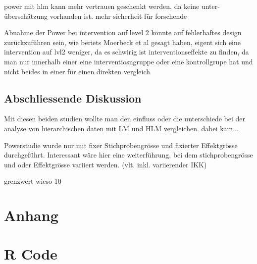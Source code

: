 \documentclass[12pt]{article}\usepackage[]{graphicx}\usepackage[]{color}
\begin{document}
power mit hlm kann mehr vertrauen geschenkt werden, da keine unter-überschätzung vorhanden ist. mehr sicherheit für forschende

Abnahme der Power bei intervention auf level 2 könnte auf fehlerhaftes design zurückzuführen sein, wie beriets Moerbeck et al gesagt haben, eigent sich eine intervention auf lvl2 weniger, da es schwirig ist interventionseffekte zu finden, da man nur innerhalb einer eine interventiosngruppe oder eine kontrollgrupe hat und nicht beides in einer für einen direkten vergleich

\subsection{Abschliessende Diskussion}
Mit diesen beiden studien wollte man den einfluss oder die unterschiede bei der analyse von hierarchischen daten mit LM und HLM vergleichen. dabei kam...

Powerstudie wurde nur mit fixer Stichprobengrösse und fixierter Effektgrösse durchgeführt. Interessant wäre hier eine weiterführung, bei dem stichprobengrösse und oder Effektgrösse variiert werden. (vlt. inkl. variierender IKK)


grenzwert wieso 10%

\newpage
\singlespacing




\section{Anhang}
\appendix
\section{R Code}
\end{document}
